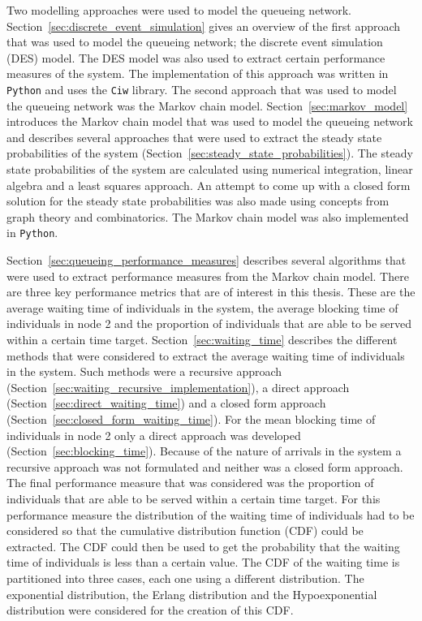 Two modelling approaches were used to model the queueing network.
Section~\ref{sec:discrete_event_simulation} gives an overview of the first
approach that was used to model the queueing network; the discrete event
simulation (DES) model.
The DES model was also used to extract certain performance measures of the
system.
The implementation of this approach was written in \texttt{Python} and uses the
\texttt{Ciw} library.
The second approach that was used to model the queueing network
was the Markov chain model.
Section~\ref{sec:markov_model} introduces the Markov chain model that was
used to model the queueing network and describes several approaches that
were used to extract the steady state probabilities of the system
(Section~\ref{sec:steady_state_probabilities}).
The steady state probabilities of the system are calculated using numerical
integration, linear algebra and a least squares approach.
An attempt to come up with a closed form solution for the steady state
probabilities was also made using concepts from graph theory and
combinatorics.
The Markov chain model was also implemented in \texttt{Python}.

Section~\ref{sec:queueing_performance_measures} describes several algorithms
that were used to extract performance measures from the Markov chain model.
There are three key performance metrics that are of interest in this thesis.
These are the average waiting time of individuals in the system, the average
blocking time of individuals in node 2 and the proportion of individuals that
are able to be served within a certain time target.
Section~\ref{sec:waiting_time} describes the different methods that were
considered to extract the average waiting time of individuals in the system.
Such methods were a recursive approach
(Section~\ref{sec:waiting_recursive_implementation}), a direct approach 
(Section~\ref{sec:direct_waiting_time}) and a closed form approach
(Section~\ref{sec:closed_form_waiting_time}).
For the mean blocking time of individuals in node 2 only a direct approach
was developed (Section~\ref{sec:blocking_time}).
Because of the nature of arrivals in the system a recursive approach was not
formulated and neither was a closed form approach.
The final performance measure that was considered was the proportion of
individuals that are able to be served within a certain time target.
For this performance measure the distribution of the waiting time of
individuals had to be considered so that the cumulative distribution
function (CDF) could be extracted.
The CDF could then be used to get the probability that the waiting time of
individuals is less than a certain value.
The CDF of the waiting time is partitioned into three cases, each one using a
different distribution.
The exponential distribution, the Erlang distribution and the Hypoexponential
distribution were considered for the creation of this CDF.

